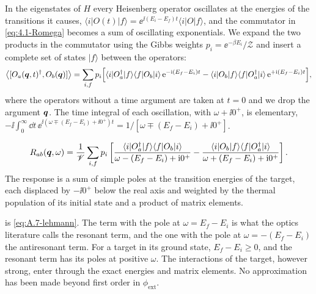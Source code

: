 In the eigenstates of $H$ every Heisenberg operator oscillates at the energies of the transitions it causes, $\langle i|O(t)|f\rangle = \ee^{\ii(E_i - E_f)t}\langle i|O|f\rangle$, and the commutator in \cref{eq:4.1-Romega} becomes a sum of oscillating exponentials. We expand the two products in the commutator using the Gibbs weights $p_i = \ee^{-\beta E_i}/\mathcal{Z}$ and insert a complete set of states $|f\rangle$ between the operators:
\begin{equation*}
  \bigl\langle[O_a(\bm{q},t)^\dagger, O_b(\bm{q})]\bigr\rangle = \sum_{i,f}p_i\Bigl[\langle i|O_a^\dagger|f\rangle\langle f|O_b|i\rangle\,\mathrm{e}^{-\mathrm{i}(E_f - E_i)t} - \langle i|O_b|f\rangle\langle f|O_a^\dagger|i\rangle\,\mathrm{e}^{+\mathrm{i}(E_f - E_i)t}\Bigr] ,
\end{equation*}
where the operators without a time argument are taken at $t = 0$ and we drop the argument $\bm{q}$. The time integral of each oscillation, with $\omega + \ii0^+$, is elementary, $-\ii\int_0^\infty\dd t\,\ee^{\ii(\omega \mp (E_f - E_i) + \ii0^+)t} = 1/[\omega \mp (E_f - E_i) + \ii0^+]$.
\begin{keyresult}
\begin{equation}
  R_{ab}(\bm{q},\omega) = \frac{1}{\mathscr{V}}\sum_{i,f}p_i\left[\frac{\langle i|O_a^\dagger|f\rangle\langle f|O_b|i\rangle}{\omega - (E_f - E_i) + \mathrm{i}0^+} - \frac{\langle i|O_b|f\rangle\langle f|O_a^\dagger|i\rangle}{\omega + (E_f - E_i) + \mathrm{i}0^+}\right] .
  \label{eq:4.1-lehmann}
\end{equation}
The response is a sum of simple poles at the transition energies of the target, each displaced by $-\ii0^+$ below the real axis and weighted by the thermal population of its initial state and a product of matrix elements.
\end{keyresult}
 is \cref{eq:A.7-lehmann}. The term with the pole at $\omega = E_f - E_i$ is what the optics literature calls the resonant term, and the one with the pole at $\omega = -(E_f - E_i)$ the antiresonant term. For a target in its ground state, $E_f - E_i \ge 0$, and the resonant term has its poles at positive $\omega$. The interactions of the target, however strong, enter through the exact energies and matrix elements. No approximation has been made beyond first order in $\phi_{\mathrm{ext}}$.

